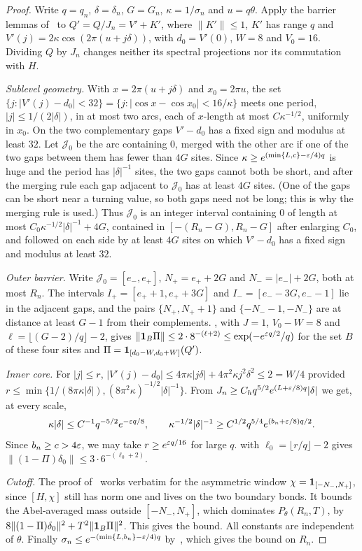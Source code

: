 \begin{proof}
Write $q=q_n$, $\delta=\delta_n$, $G=G_n$, $\kappa=1/\sigma_n$ and $u=q\theta$. Apply the barrier lemmas of~\cite[Section~4]{DMamo} to $Q'=Q/J_n=V'+K'$, where $\|K'\|\le1$, $K'$ has range $q$ and $V'(j)=2\kappa\cos(2\pi(u+j\delta))$, with $d_0=V'(0)$, $W=8$ and $V_0=16$. Dividing $Q$ by $J_n$ changes neither its spectral projections nor its commutation with $H$.

\emph{Sublevel geometry.} With $x=2\pi(u+j\delta)$ and $x_0=2\pi u$, the set $\{j:|V'(j)-d_0|<32\}=\{j:|\cos x-\cos x_0|<16/\kappa\}$ meets one period, $|j|\le1/(2|\delta|)$, in at most two arcs, each of $x$-length at most $C\kappa^{-1/2}$, uniformly in $x_0$. On the two complementary gaps $V'-d_0$ has a fixed sign and modulus at least $32$. Let $\mathcal J_0$ be the arc containing $0$, merged with the other arc if one of the two gaps between them has fewer than $4G$ sites. Since $\kappa\ge e^{(\min\{L,c\}-\varepsilon/4)q}$ is huge and the period has $|\delta|^{-1}$ sites, the two gaps cannot both be short, and after the merging rule each gap adjacent to $\mathcal J_0$ has at least $4G$ sites. (One of the gaps can be short near a turning value, so both gaps need not be long; this is why the merging rule is used.) Thus $\mathcal J_0$ is an integer interval containing $0$ of length at most $C_0\kappa^{-1/2}|\delta|^{-1}+4G$, contained in $[-(R_n-G),R_n-G]$ after enlarging $C_0$, and followed on each side by at least $4G$ sites on which $V'-d_0$ has a fixed sign and modulus at least $32$.

\emph{Outer barrier.} Write $\mathcal J_0=[e_-,e_+]$, $N_+=e_++2G$ and $N_-=|e_-|+2G$, both at most $R_n$. The intervals $I_+=[e_++1,e_++3G]$ and $I_-=[e_--3G,e_--1]$ lie in the adjacent gaps, and the pairs $\{N_+,N_++1\}$ and $\{-N_--1,-N_-\}$ are at distance at least $G-1$ from their complements. \cite[Lemma~4.1]{DMamo}, with $J=1$, $V_0-W=8$ and $\ell=\lfloor(G-2)/q\rfloor-2$, gives $\|\mathbf 1_B\Pi\|\le2\cdot8^{-(\ell+2)}\le\exp(-e^{\varepsilon q/2}/q)$ for the set $B$ of these four sites and $\Pi=\mathbf 1_{[d_0-W,d_0+W]}(Q')$.

\emph{Inner core.} For $|j|\le r$, $|V'(j)-d_0|\le4\pi\kappa|j\delta|+4\pi^2\kappa j^2\delta^2\le2=W/4$ provided $r\le\min\{1/(8\pi\kappa|\delta|),(8\pi^2\kappa)^{-1/2}|\delta|^{-1}\}$. From $J_n\ge C_hq^{5/2}e^{(L+\varepsilon/8)q}|\delta|$ we get, at every scale,
\[
\kappa|\delta|\le C^{-1}q^{-5/2}e^{-\varepsilon q/8},\qquad\kappa^{-1/2}|\delta|^{-1}\ge C^{1/2}q^{5/4}e^{(b_n+\varepsilon/8)q/2}.
\]
Since $b_n\ge c>4\varepsilon$, we may take $r\ge e^{\varepsilon q/16}$ for large $q$. \cite[Lemma~4.2]{DMamo} with $\ell_0=\lfloor r/q\rfloor-2$ gives $\|(1-\Pi)\delta_0\|\le3\cdot6^{-(\ell_0+2)}$.

\emph{Cutoff.} The proof of~\cite[Lemma~4.3]{DMamo} works verbatim for the asymmetric window $\chi=\mathbf 1_{[-N_-,N_+]}$, since $[H,\chi]$ still has norm one and lives on the two boundary bonds. It bounds the Abel-averaged mass outside $[-N_-,N_+]$, which dominates $P_\theta(R_n,T)$, by $8\|(1-\Pi)\delta_0\|^2+T^2\|\mathbf 1_B\Pi\|^2$. This gives the bound. All constants are independent of $\theta$. Finally $\sigma_n\le e^{-(\min\{L,b_n\}-\varepsilon/4)q}$ by~\cite[Lemma~3.4]{DMamo}, which gives the bound on $R_n$.
\end{proof}

